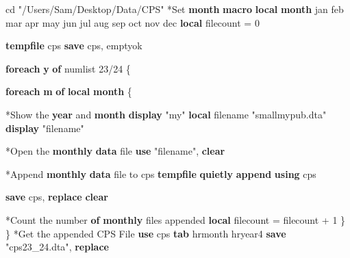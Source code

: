 \documentclass[
]{book}
\newenvironment{Shaded}{\begin{snugshade}}{\end{snugshade}}
\newcommand{\FunctionTok}[1]{\textcolor[rgb]{0.13,0.29,0.53}{\textbf{#1}}}
\newcommand{\KeywordTok}[1]{\textcolor[rgb]{0.13,0.29,0.53}{\textbf{#1}}}
\newcommand{\NormalTok}[1]{#1}
\newcommand{\OtherTok}[1]{\textcolor[rgb]{0.56,0.35,0.01}{#1}}
\newcommand{\StringTok}[1]{\textcolor[rgb]{0.31,0.60,0.02}{#1}}
\begin{document}
\begin{Shaded}
\begin{Highlighting}[]
\NormalTok{cd }\StringTok{"/Users/Sam/Desktop/Data/CPS"}
\NormalTok{*Set }\FunctionTok{month} \KeywordTok{macro}
\KeywordTok{local} \FunctionTok{month}\NormalTok{ jan feb mar apr may jun jul aug sep oct nov dec}
\KeywordTok{local}\NormalTok{ filecount = 0}

\KeywordTok{tempfile}\NormalTok{ cps}
\KeywordTok{save} \OtherTok{\textasciigrave{}cps\textquotesingle{}}\NormalTok{, emptyok}

\KeywordTok{foreach} \FunctionTok{y} \KeywordTok{of}\NormalTok{ numlist 23/24 \{}

  \KeywordTok{foreach} \FunctionTok{m} \KeywordTok{of} \KeywordTok{local} \FunctionTok{month}\NormalTok{ \{}
        
\NormalTok{    *Show the }\FunctionTok{year}\NormalTok{ and }\FunctionTok{month}
    \KeywordTok{display} \StringTok{"\textasciigrave{}m\textquotesingle{}\textasciigrave{}y\textquotesingle{}"}
    \KeywordTok{local}\NormalTok{ filename }\StringTok{"small\textasciigrave{}m\textquotesingle{}\textasciigrave{}y\textquotesingle{}pub.dta"}
    \KeywordTok{display} \StringTok{"\textasciigrave{}filename\textquotesingle{}"}
        
\NormalTok{    *Open the }\FunctionTok{monthly} \KeywordTok{data}\NormalTok{ file}
    \KeywordTok{use} \StringTok{"\textasciigrave{}filename\textquotesingle{}"}\NormalTok{, }\KeywordTok{clear}

\NormalTok{      *Append }\FunctionTok{monthly} \KeywordTok{data}\NormalTok{ file to cps }\KeywordTok{tempfile}
      \KeywordTok{quietly} \KeywordTok{append} \KeywordTok{using} \OtherTok{\textasciigrave{}cps\textquotesingle{}}

      \KeywordTok{save} \OtherTok{\textasciigrave{}cps\textquotesingle{}}\NormalTok{, }\KeywordTok{replace}
      \KeywordTok{clear}
      
\NormalTok{      *Count the number }\KeywordTok{of} \FunctionTok{monthly}\NormalTok{ files appended}
      \KeywordTok{local}\NormalTok{ filecount = }\OtherTok{\textasciigrave{}filecount\textquotesingle{}}\NormalTok{ + 1}
\NormalTok{    \}}
\NormalTok{\}}
\NormalTok{*Get the appended CPS File}
\KeywordTok{use} \OtherTok{\textasciigrave{}cps\textquotesingle{}}
\KeywordTok{tab}\NormalTok{ hrmonth hryear4}
\KeywordTok{save} \StringTok{"cps23\_24.dta"}\NormalTok{, }\KeywordTok{replace}
\end{Highlighting}
\end{Shaded}
\end{document}
